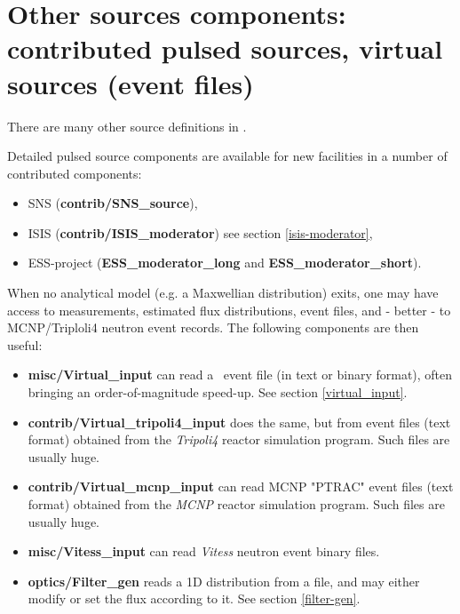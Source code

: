 



\newpage




\newpage




\newpage




\newpage
\section{Other sources components: contributed pulsed sources, virtual sources (event files)}
\label{sources-seealso}

There are many other source definitions in \MCS .

Detailed pulsed source components are available for new facilities
in a number of contributed components:
\begin{itemize}
\item SNS ({\bf contrib/SNS\_source}),
\item ISIS ({\bf contrib/ISIS\_moderator}) see section \ref{isis-moderator},
\item ESS-project ({\bf ESS\_moderator\_long} and {\bf  ESS\_moderator\_short}).
\end{itemize}

When no analytical model (e.g. a Maxwellian distribution) exits,
one may have access to measurements, estimated flux distributions,
event files, and - better - to MCNP/Triploli4 neutron event records.
The following components are then useful:

\begin{itemize}
\item{{\bf misc/Virtual\_input} can read a \MCS\ event file
(in text or binary format), often bringing an order-of-magnitude speed-up.
See section \ref{virtual_input}.}
\item{{\bf contrib/Virtual\_tripoli4\_input} does the same, but from event files (text format) obtained from the \emph{Tripoli4} \cite{tripoli_webpage} reactor simulation program. Such files are usually huge.}
\item{{\bf contrib/Virtual\_mcnp\_input} can read MCNP "PTRAC" event files (text format) obtained from the \emph{MCNP} \cite{mcnp_webpage} reactor simulation program. Such files are usually huge.}
\item{{\bf misc/Vitess\_input} can read \emph{Vitess} \cite{vitess_webpage} neutron event binary files.}
\item{{\bf optics/Filter\_gen} reads a 1D distribution from a file, and may either modify or set the flux according to it. See section \ref{filter-gen}.}
\end{itemize}
